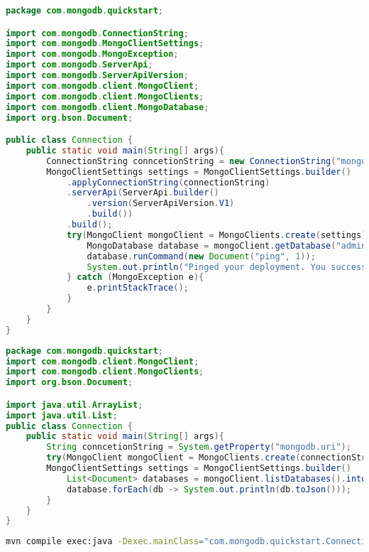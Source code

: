 \documentclass[../main.tex]{subfiles}
\begin{document}
\begin{lstlisting}[caption=Java connection,language=Java]
package com.mongodb.quickstart;

import com.mongodb.ConnectionString;
import com.mongodb.MongoClientSettings;
import com.mongodb.MongoException;
import com.mongodb.ServerApi;
import com.mongodb.ServerApiVersion;
import com.mongodb.client.MongoClient;
import com.mongodb.client.MongoClients;
import com.mongodb.client.MongoDatabase;
import org.bson.Document;

public class Connection {
	public static void main(String[] args){
		ConnectionString conncetionString = new ConnectionString("mongodb+srv://student-joe:<password>@sandbox.svlx7.mongodb.net/?retryWrites=true&w=majority");
		MongoClientSettings settings = MongoClientSettings.builder()
			.applyConnectionString(connectionString)
			.serverApi(ServerApi.builder()
				.version(ServerApiVersion.V1)
				.build())
			.build();
			try(MongoClient mongoClient = MongoClients.create(settings)){
				MongoDatabase database = mongoClient.getDatabase("admin");
				database.runCommand(new Document("ping", 1));
				System.out.println("Pinged your deployment. You successfully connected to MongoDB!");
			} catch (MongoException e){
				e.printStackTrace();
			}
		}
	}
}
\end{lstlisting}

\begin{lstlisting}[caption=Java client database fetch documents,language=Java]
package com.mongodb.quickstart;
import com.mongodb.client.MongoClient;
import com.mongodb.client.MongoClients;
import org.bson.Document;

import java.util.ArrayList;
import java.util.List;
public class Connection {
	public static void main(String[] args){
		String conncetionString = System.getProperty("mongodb.uri");
		try(MongoClient mongoClient = MongoClients.create(connectionString)){
		MongoClientSettings settings = MongoClientSettings.builder()
			List<Document> databases = mongoClient.listDatabases().into(new ArrayList<>());
			database.forEach(db -> System.out.println(db.toJson()));
		}
	}
}
\end{lstlisting}


\begin{lstlisting}[caption=maven command,language=bash]
mvn compile exec:java -Dexec.mainClass="com.mongodb.quickstart.Connection" -Dmongodb.uri="mongodb+srv://m001-student:sandbox1995@cluster0.6sfcv.mongodb.net/test?w=majority"
\end{lstlisting}



\printglossaries
\end{document}

